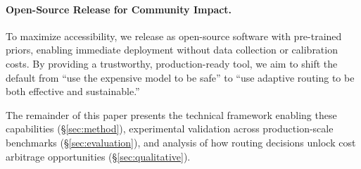 \paragraph{Open-Source Release for Community Impact.} To maximize accessibility, we release \ours{} as open-source software with pre-trained priors, enabling immediate deployment without data collection or calibration costs. By providing a trustworthy, production-ready tool, we aim to shift the default from ``use the expensive model to be safe'' to ``use adaptive routing to be both effective and sustainable.''

The remainder of this paper presents the technical framework enabling these capabilities (\S\ref{sec:method}), experimental validation across production-scale benchmarks (\S\ref{sec:evaluation}), and analysis of how routing decisions unlock cost arbitrage opportunities (\S\ref{sec:qualitative}).

